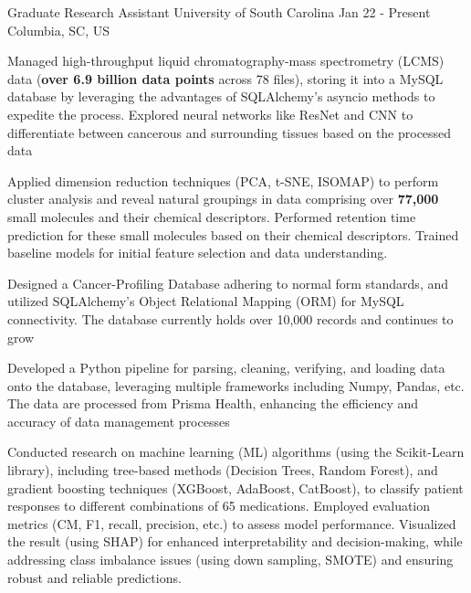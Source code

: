 
\vspace*{-0.2cm}

\begin{cventries}
    \cventry
        {Graduate Research Assistant} %
        {University of South Carolina} %
        {Jan 22 - Present}
        {Columbia, SC, US} %
        {
            \begin{cvitemsfree} %
                \item{Managed high-throughput liquid chromatography-mass spectrometry (LCMS) data (\textbf{over 6.9 billion data points} across 78 files), storing it into a MySQL database by leveraging the advantages of SQLAlchemy's asyncio methods to expedite the process. Explored neural networks like ResNet and CNN to differentiate between cancerous and surrounding tissues based on the processed data}
                \item{Applied dimension reduction techniques (PCA, t-SNE, ISOMAP) to perform cluster analysis and reveal natural groupings in data comprising over \textbf{77,000} small molecules and their chemical descriptors. Performed retention time prediction for these small molecules based on their chemical descriptors. Trained baseline models for initial feature selection and data understanding.}
                \item{Designed a Cancer-Profiling Database adhering to normal form standards, and utilized SQLAlchemy's Object Relational Mapping (ORM) for MySQL connectivity. The database currently holds over 10,000 records and continues to grow}
                \item{Developed a Python pipeline for parsing, cleaning, verifying, and loading data onto the database, leveraging multiple frameworks including Numpy, Pandas, etc. The data are processed from Prisma Health, enhancing the efficiency and accuracy of data management processes}
                \item{Conducted research on machine learning (ML) algorithms (using the Scikit-Learn library), including tree-based methods (Decision Trees, Random Forest), and gradient boosting techniques (XGBoost, AdaBoost, CatBoost), to classify patient responses to different combinations of 65 medications. Employed evaluation metrics (CM, F1, recall, precision, etc.) to assess model performance. Visualized the result (using SHAP) for enhanced interpretability and decision-making, while addressing class imbalance issues (using down sampling, SMOTE) and ensuring robust and reliable predictions.}

\end{cvitemsfree}}
\end{cventries}
